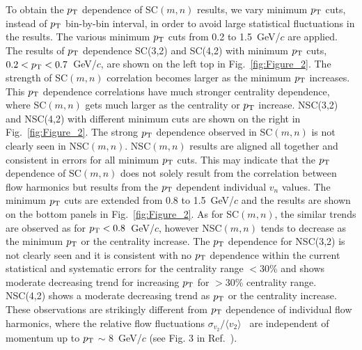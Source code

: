 To obtain the $p_{\rm T}$ dependence of SC$(m,n)$ results, we vary minimum $p_{\rm T}$ cuts, instead of $p_{\rm T}$ bin-by-bin interval, in order to avoid large statistical fluctuations in the results. The various minimum $p_{\rm T}$ cuts from 0.2 to 1.5~GeV/$c$ are applied.
The results of $p_{\rm T}$ dependence SC(3,2) and SC(4,2) with minimum $p_{\rm T}$ cuts, $0.2<p_{\rm T}<0.7$~GeV/$c$, are shown on the left top in Fig.~\ref{fig:Figure_2}.
The strength of SC$(m,n)$ correlation becomes larger as the minimum $p_{\rm T}$ increases. 
This $p_{\rm T}$ dependence correlations have much stronger centrality dependence, where SC$(m,n)$ gets much larger as the centrality or $p_{\rm T}$ increase. 
NSC(3,2) and NSC(4,2) with different minimum cuts are shown on the right in Fig.~\ref{fig:Figure_2}.
The strong $p_{\rm T}$ dependence observed in SC$(m,n)$ is not clearly seen in NSC$(m,n)$. NSC$(m,n)$ results are aligned all together and consistent in errors for all minimum $p_{\rm T}$ cuts. 
This may indicate that the $p_{\rm T}$ dependence of SC$(m,n)$ does not solely result from the correlation between flow harmonics but results from the $p_{\rm T}$  dependent individual $v_n$ values. 
The minimum $p_{\rm T}$ cuts are extended from 0.8  to 1.5~GeV/$c$ and the results are shown on the bottom panels in Fig.~\ref{fig:Figure_2}.
As for SC$(m,n)$, the similar trends are observed as for $p_{\rm T}<0.8$~GeV/$c$, however NSC$(m,n)$ tends to decrease as the minimum $p_{\rm T}$ or the centrality increase.
The $p_{\rm T}$ dependence for NSC(3,2) is not clearly seen and it is consistent with no $p_{\rm T}$ dependence within the current statistical and systematic errors for the centrality range $<$30\% and shows moderate decreasing trend for increasing $p_{\rm T}$ for $>$30\% centrality range.
NSC(4,2) shows a moderate decreasing trend as $p_{\rm T}$ or the centrality increase. These observations are strikingly different from $p_{\rm T}$ dependence of individual flow harmonics, where the relative flow fluctuations $\sigma_{v_2}/\langle v_{2} \rangle$~\cite{Voloshin:2008dg} are independent of momentum up to $p_{\rm T}$ $\sim$ 8~GeV/$c$ (see Fig. 3 in Ref.~\cite{Abelev:2012di}).


